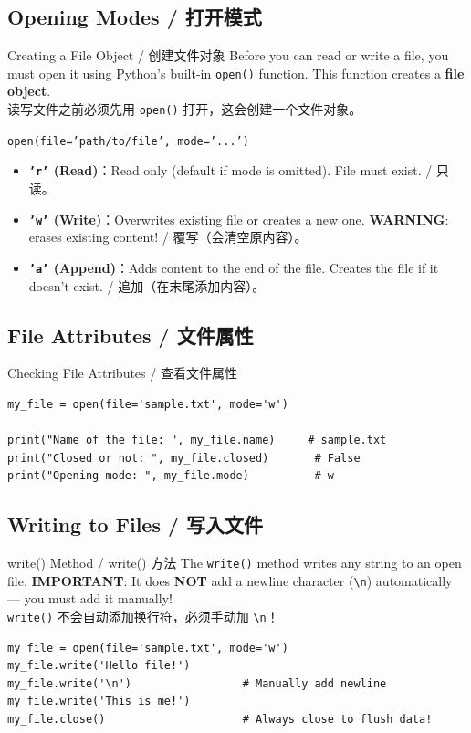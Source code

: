 \documentclass[11pt,a4paper]{article}
\begin{document}
\subsection{Opening Modes / 打开模式}

\begin{concept}{Creating a File Object / 创建文件对象}
    Before you can read or write a file, you must open it using Python's built-in \texttt{open()} function. This function creates a \textbf{file object}. \\
    读写文件之前必须先用 \texttt{open()} 打开，这会创建一个文件对象。

    \texttt{open(file='path/to/file', mode='...')}
    \begin{itemize}[itemsep=0.5em]
        \item \textbf{\texttt{'r'} (Read)}：Read only (default if mode is omitted). File must exist. / 只读。
        \item \textbf{\texttt{'w'} (Write)}：Overwrites existing file or creates a new one. \textbf{WARNING}: erases existing content! / 覆写（会清空原内容）。
        \item \textbf{\texttt{'a'} (Append)}：Adds content to the end of the file. Creates the file if it doesn't exist. / 追加（在末尾添加内容）。
    \end{itemize}
\end{concept}

\subsection{File Attributes / 文件属性}

\begin{examplebox}{Checking File Attributes / 查看文件属性}
\begin{lstlisting}
my_file = open(file='sample.txt', mode='w')

print("Name of the file: ", my_file.name)     # sample.txt
print("Closed or not: ", my_file.closed)       # False
print("Opening mode: ", my_file.mode)          # w
\end{lstlisting}
\end{examplebox}

\subsection{Writing to Files / 写入文件}

\begin{examplebox}{write() Method / write() 方法}
    The \texttt{write()} method writes any string to an open file. \textbf{IMPORTANT}: It does \textbf{NOT} add a newline character (\texttt{\textbackslash n}) automatically — you must add it manually! \\
    \texttt{write()} 不会自动添加换行符，必须手动加 \texttt{\textbackslash n}！
\begin{lstlisting}
my_file = open(file='sample.txt', mode='w')
my_file.write('Hello file!')
my_file.write('\n')                 # Manually add newline
my_file.write('This is me!')
my_file.close()                     # Always close to flush data!
\end{lstlisting}
\end{examplebox}
\end{document}
